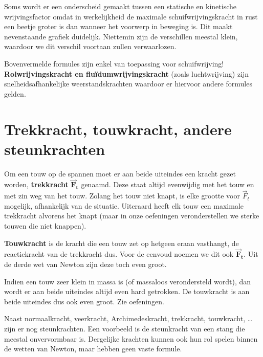 \documentclass{ximera}
\begin{document}

\begin{remark}

Soms wordt er een onderscheid gemaakt tussen een statische en kinetische wrijvingsfactor omdat in werkelijkheid de maximale schuifwrijvingskracht in rust een beetje groter is dan wanneer het voorwerp in beweging is.
Dit maakt nevenstaande grafiek duidelijk. 
Niettemin zijn de verschillen meestal klein, waardoor we dit verschil voortaan zullen verwaarlozen.
\end{remark}

\begin{remark}
Bovenvermelde formules zijn enkel van toepassing voor schuifwrijving! \textbf{Rolwrijvingskracht en fluïdumwrijvingskracht} (zoals luchtwrijving) zijn snelheidsafhankelijke weerstandskrachten waardoor er hiervoor andere formules gelden. 
\end{remark}
  

\section*{Trekkracht, touwkracht, andere steunkrachten}

Om een touw op de spannen moet er aan beide uiteindes een kracht gezet worden, \textbf{trekkracht} \({\overrightarrow{\mathbf{F}}}_{\mathbf{t}}\) genaamd. 
Deze staat altijd evenwijdig met het touw en met zin weg van het touw. 
Zolang het touw niet knapt, is elke grootte voor \({\overrightarrow{F}}_{t}\) mogelijk, afhankelijk van de situatie. 
Uiteraard heeft elk touw een maximale trekkracht alvorens het knapt (maar in onze oefeningen veronderstellen we sterke touwen die niet knappen).

\textbf{Touwkracht} is de kracht die een touw zet op hetgeen eraan vasthangt, de reactiekracht van de trekkracht dus. 
Voor de eenvoud noemen we dit ook \({\overrightarrow{\mathbf{F}}}_{\mathbf{t}}\). 
Uit de derde wet van Newton zijn deze toch even groot.

Indien een touw zeer klein in massa is (of massaloos verondersteld wordt), dan wordt er aan beide uiteindes altijd even hard getrokken. 
De touwkracht is aan beide uiteindes dus ook even groot. 
Zie oefeningen.

Naast normaalkracht, veerkracht, Archimedeskracht, trekkracht, touwkracht, \ldots{} zijn er nog steunkrachten. 
Een voorbeeld is de steunkracht van een stang die meestal onvervormbaar is. 
Dergelijke krachten kunnen ook hun rol spelen binnen de wetten van Newton, maar hebben geen vaste formule.
\end{document}
